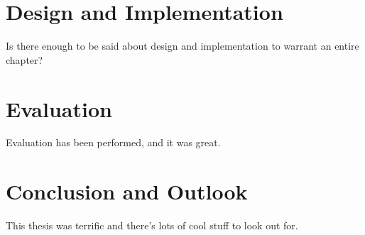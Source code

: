 \documentclass[
    fontsize=12pt,
    headings=small,
    parskip=half,
    bibliography=totoc,
    numbers=noenddot,
    open=any
    ]{scrreprt}
\begin{document}


\chapter{Design and Implementation}
Is there enough to be said about design and implementation to warrant an entire chapter?


\chapter{Evaluation}
Evaluation has been performed, and it was great.


\chapter{Conclusion and Outlook}
This thesis was terrific and there's lots of cool stuff to look out for.

\end{document}
